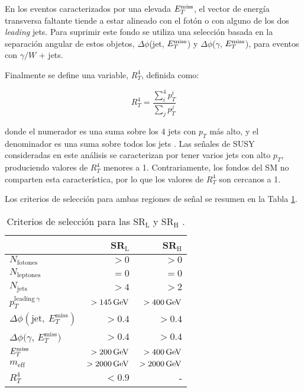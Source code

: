 En los eventos caracterizados por una elevada $E_{T}^{\text{miss}}$, el vector de energía transversa faltante tiende a estar alineado con el fotón o con alguno de los dos \textit{leading} jets. Para suprimir este fondo se utiliza una selección basada en la separación angular de estos objetos, $\Delta\phi$(jet, $E_{T}^{\text{miss}}$) y $\Delta\phi$($\gamma$, $E_{T}^{\text{miss}}$), para eventos con $\gamma/W$ + jets.

Finalmente se define una variable, $R_{T}^{4}$, definida como:

\begin{equation}
R_{T}^{4}=\frac{\sum_{i}^{4}p_{T}^{i}}{\sum_{j}p_{T}^{j}}
\end{equation}

\noindent
donde el numerador es una suma sobre los 4 jets con $p_{T}$ más alto, y el denominador es una suma sobre todos los jets \cite{Collaboration:2198651}. Las señales de SUSY consideradas en este análisis se caracterizan por tener varios jets con alto $p_{T}$, produciendo valores de $R_{T}^{4}$ menores a 1. Contrariamente, los fondos del SM no comparten esta característica, por lo que los valores de $R_{T}^{4}$ son cercanos a 1.

Los criterios de selección para ambas regiones de señal se resumen en la Tabla \ref{srs}.

\begin{table}
\centering
\caption{Criterios de selección para las SR$_{\text{L}}$ y SR$_{\text{H}}$ \cite{ATLAS:2016fks}.}
\begin{tabular}{ l | r | r }

	\hline

	& SR$_{\text{L}}$ & SR$_{\text{H}}$ \\

	\hline

	$N_{\text{fotones}}$ 	& $> 0$ 	& $> 0$ \\

	$N_{\text{leptones}}$ 	& $=0$ 	& $=0$ \\

	$N_{\text{jets}}$ 	& $>4$ 	& $>2$ \\

	$p_{T}^{\text{leading}\: \gamma}$ 	& $> 145 \, \mathrm{GeV}$ 	& $> 400 \, \mathrm{GeV}$ \\

	$\Delta\phi(\text{jet},\: E_{T}^{\text{miss}})$ 	& $> 0.4$ 	& $> 0.4$ \\

	$\Delta\phi(\gamma$,\: $E_{T}^{\text{miss}})$ 	& $>0.4$ 	& $>0.4$ \\

	$E_{T}^{\text{miss}}$ 	& $>200\, \mathrm{GeV}$ 	& $>400\, \mathrm{GeV}$ \\

	$m_{\text{eff}}$ 	& $> 2000 \, \mathrm{GeV}$ 	& $> 2000 \, \mathrm{GeV}$ \\

	$R_{T}^{4}$ 	& $< 0.9$ 	& - \\

	\hline


\end{tabular}
\label{srs}
\end{table}

